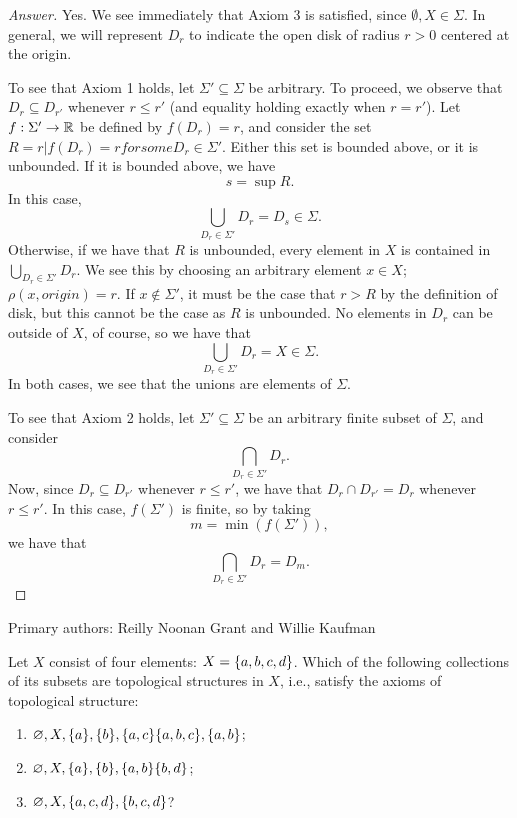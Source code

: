 \begin{proof}[Answer]
    Yes. We see immediately that Axiom 3 is satisfied, since $\emptyset, X \in
    \Sigma$. In general, we will represent $D_r$ to indicate the open disk of
    radius $r > 0$ centered at the origin.

    To see that Axiom 1 holds, let $\Sigma' \subseteq \Sigma$ be arbitrary. To
    proceed, we observe that $D_r \subseteq D_{r'}$ whenever $r \leq r'$ (and
    equality holding exactly when $r = r'$). Let $f : \Sigma' \to \mathbb{R}$ be
    defined by $f(D_r) = r$, and consider the set $R = {r | f(D_r) = r for some D_r \in \Sigma'}$. Either this set is
    bounded above, or it is unbounded. If it is bounded above, we have
    \[
        s = \sup R.
    \]
    In this case,
    \[
        \bigcup_{D_r \in \Sigma'} D_r = D_s \in \Sigma.
    \]
    Otherwise, if we have that $R$ is unbounded, every element in $X$ is contained in $\bigcup_{D_r \in \Sigma'} D_r$. We see this by choosing an arbitrary element $x \in X$;  $\rho(x, origin) = r$. If $x \not \in \Sigma'$, it must be the case that $r > R$ by the definition of disk, but this cannot be the case as $R$ is unbounded. No elements in $D_r$ can be outside of $X$, of course, so we have that 
    \[
        \bigcup_{D_r \in \Sigma'} D_r = X \in \Sigma.
    \]
    In both cases, we see that the unions are elements of $\Sigma$.

    To see that Axiom 2 holds, let $\Sigma' \subseteq \Sigma$ be an arbitrary
    finite subset of $\Sigma$, and consider
    \[
        \bigcap_{D_r \in \Sigma'} D_r.
    \]
    Now, since $D_r \subseteq D_{r'}$ whenever $r \leq r'$, we have that $D_r
    \cap D_{r'} = D_r$ whenever $ r \leq r'$. In this case, $f(\Sigma')$ is
    finite, so by taking
    \[
        m = \min(f(\Sigma')),
    \]
    we have that
    \[
        \bigcap_{D_r \in \Sigma'} D_r = D_m.
    \]
\end{proof}

Primary authors: Reilly Noonan Grant and Willie Kaufman

\begin{minorEx} %
    Let $X$ consist of four elements: $X = \{a, b, c, d\}$. Which of the
    following collections of its subsets are topological structures in $X$,
    i.e., satisfy the axioms of topological structure:
    \begin{enumerate}
        \item $\varnothing, X, \{a\}, \{b\}, \{a,c\} \{a,b,c\},
            \{a,b\}$;
        \item $\varnothing, X, \{a\}, \{b\}, \{a,b\} \{b,d\}$;
        \item $\varnothing, X, \{a,c,d\}, \{b,c,d\}$?
    \end{enumerate}
\end{minorEx}

